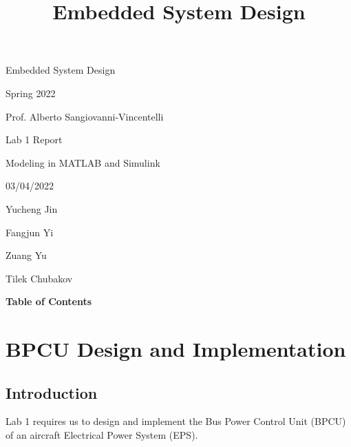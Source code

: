 \documentclass{mcmthesis}
\title{Embedded System Design}
\begin{document}
\begin{center}


\item
\item

\huge{Embedded System Design} 

\item
\item

\Large{Spring 2022}

\item
\item

\Large{Prof.  Alberto Sangiovanni-Vincentelli}

\end{center}

\begin{center}

\item
\item
\item
\Huge{Lab 1 Report}

\item

\Huge{Modeling in MATLAB and Simulink}

\end{center}

\begin{center}

\item
\Large{03/04/2022}
\item
\item
\Large{Yucheng Jin}
\item
\Large{Fangjun Yi}
\item
\Large{Zuang Yu}
\item
\Large{Tilek Chubakov}

\end{center}

\pagebreak
\renewcommand{\contentsname}{\tiny{}}
\begin{center}
\textbf{\Large{Table of Contents}}
\end{center}
\tableofcontents

\pagebreak

\section{BPCU Design and Implementation}
\subsection{Introduction}
Lab 1 requires us to design and implement the Bus Power Control Unit (BPCU) of an aircraft Electrical Power System (EPS).  
\end{document}
